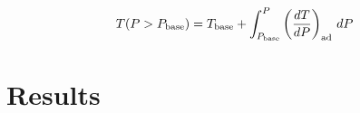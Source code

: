 \documentclass[11pt]{ucscthesisbs}
\begin{document}
\begin{equation}
T(P>P_{\rm base}) = T_{\rm base} + \int_{P_{\rm base}}^P\left(\frac{dT}{dP}\right)_{\rm ad}\,d P
\end{equation}





\chapter{Results}
\end{document}
